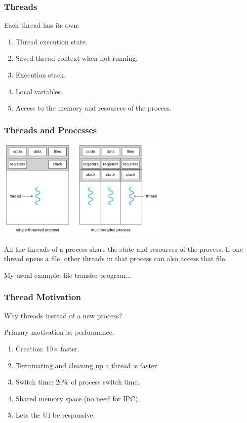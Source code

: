 \begin{frame}
\frametitle{Threads}

Each thread has its own:
\begin{enumerate}
	\item Thread execution state.
	\item Saved thread context when not running.
	\item Execution stack.
	\item Local variables.
	\item Access to the memory and resources of the process.
\end{enumerate}


\end{frame}



\begin{frame}
\frametitle{Threads and Processes}

\begin{center}
	\includegraphics[width=0.625\textwidth]{images/mthread2.png}
\end{center}

All the threads of a process share the state and resources of the process. If one thread opens a file, other threads in that process can also access that file.

My usual example: file transfer program...

\end{frame}


\begin{frame}
\frametitle{Thread Motivation}
Why threads instead of a new process?

Primary motivation is: performance.

\begin{enumerate}
	\item Creation: 10$\times$ faster.
	\item Terminating and cleaning up a thread is faster.
	\item Switch time: 20\% of process switch time.
	\item Shared memory space (no need for IPC).
	\item Lets the UI be responsive.
\end{enumerate}

\end{frame}

